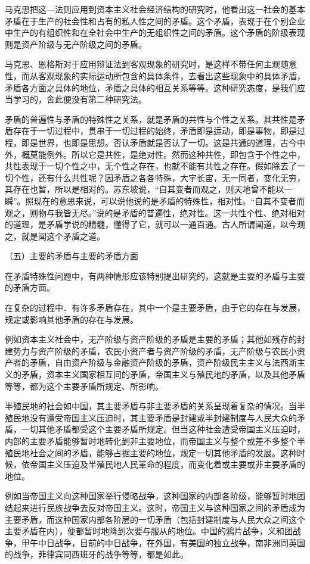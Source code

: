 \documentclass[UTF8, 12pt, a4paper]{ctexrep}
\begin{document}
马克思把这—法则应用到资本主义社会经济结构的研究时，他看出这一社会的基本矛盾在于生产的社会性和占有的私人性之间的矛盾。这个矛盾，表现于在个别企业中生产的有组织性和在全社会中生产的无组织性之间的矛盾。这个矛盾的阶级表现则是资产阶级与无产阶级之间的矛盾。

马克思、恩格斯对于应用辩证法到客观现象的研究时，是这样不带任何主观随意性，而从客观现象的实际运动所包含的具体条件，去看出这些现象中的具体矛盾，矛盾各方面之具体的地位，矛盾之具体的相互关系等等。这种研究态度，是我们应当学习的，舍此便没有第二种研究法。

矛盾的普遍性与矛盾的特殊性之关系，就是矛盾的共性与个性之关系。其共性是矛盾存在于一切过程中，贯串于一切过程的始终，矛盾即是运动，即是事物，即是过程，即是世界，也即是思想。否认矛盾就是否认了一切。这是共通的道理，古今中外，概莫能例外。所以它是共性，是绝对性。然而这种共性，即包含于个性之中，共性表现于一切个性之中，无个性之存在，也就不能有共性之存在。假如除去了一切个性，还有什么共性呢？因矛盾之各各特殊，大宇长宙，无一同者，变化无穷，其存在也暂，所以是相对的。苏东坡说，“自其变者而观之，则天地曾不能以一瞬”。照现在的意思来说，可以说他说的是矛盾的特殊性，相对性。“自其不变者而观之，则物与我皆无尽。”说的是矛盾的普遍性，绝对性。这一共性个性、绝对相对的道理，是矛盾学说的精髓，懂得了它，就可以一通百通。古人所谓闻道，以今观之，就是闻这个矛盾之道。

（五）主要的矛盾与主要的矛盾方面

在矛盾特殊性问题中，有两种情形应该特别提出研究的，这就是主要的矛盾与主要的矛盾方面。

在复杂的过程中．有许多矛盾存在，其中一个是主要矛盾，由于它的存在与发展，规定或影响其他矛盾的存在与发展。

例如资本主义社会中，无产阶级与资产阶级的矛盾是主要的矛盾；其他如残存的封建势力与资产阶级的矛盾，农民小资产者与资产阶级的矛盾，无产阶级与农民小资产者的矛盾，自由资产阶级与金融资产阶级的矛盾，资产阶级民主主义与法西斯主义的矛盾，资本主义国家相互间的矛盾，帝国主义与殖民地的矛盾，以及其他矛盾等等，都为这个主要矛盾所规定、所影响。

半殖民地的社会如中国，其主要矛盾与非主要矛盾的关系呈现着复杂的情况。当半殖民地没有遭受帝国主义压迫时，其主要矛盾是封建或半封建制度与人民大众的矛盾，一切其他矛盾都受这个主要矛盾所规定。但当这种社会遭受帝国主义压迫时，内部的主要矛盾能够暂时地转化到非主要地位，而帝国主义与整个或差不多整个半殖民地社会之间的矛盾，能够占据主要的地位，规定一切其他矛盾的发展。这种时候，依帝国主义压迫及半殖民地人民革命的程度，而变化着或主要或非主要矛盾的地位。

例如当帝国主义向这种国家举行侵略战争，这种国家的内部各阶级，能够暂时地团结起来进行民族战争去反对帝国主义。这时，帝国主义与这种国家之间的矛盾成为主要矛盾，而这种国家内部各阶层的一切矛盾（包括封建制度与人民大众之间这个主要矛盾在内），便都暂时地降到次要与服从的地位。中国的鸦片战争，义和团战争，甲午中日战争，目前的中日战争，在外国，有美国的独立战争，南非洲同英国的战争，菲律宾同西班牙的战争等等，都是如此。
\end{document}
